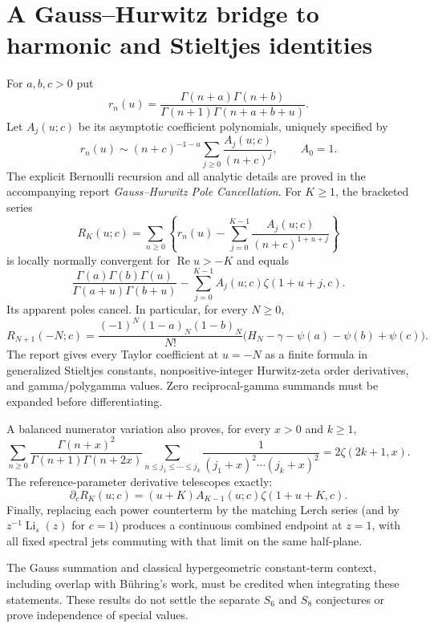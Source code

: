 \section{A Gauss--Hurwitz bridge to harmonic and Stieltjes identities}
\label{gh:sec:summary}
For $a,b,c>0$ put
\[
 r_n(u)=\frac{\Gamma(n+a)\Gamma(n+b)}
 {\Gamma(n+1)\Gamma(n+a+b+u)}.
\]
Let $A_j(u;c)$ be its asymptotic coefficient polynomials, uniquely specified by
\[
 r_n(u)\sim(n+c)^{-1-u}\sum_{j\ge0}\frac{A_j(u;c)}{(n+c)^j},
 \qquad A_0=1.
\]
The explicit Bernoulli recursion and all analytic details are proved in the
accompanying report \emph{Gauss--Hurwitz Pole Cancellation}.
For $K\ge1$, the bracketed series
\[
 R_K(u;c)=\sum_{n\ge0}\left\{r_n(u)-
              \sum_{j=0}^{K-1}\frac{A_j(u;c)}{(n+c)^{1+u+j}}\right\}
\]
is locally normally convergent for $\operatorname{Re}u>-K$ and equals
\[
 \frac{\Gamma(a)\Gamma(b)\Gamma(u)}{\Gamma(a+u)\Gamma(b+u)}
 -\sum_{j=0}^{K-1}A_j(u;c)\zeta(1+u+j,c).
\]
Its apparent poles cancel.  In particular, for every $N\ge0$,
\[
 R_{N+1}(-N;c)=\frac{(-1)^N(1-a)_N(1-b)_N}{N!}
 \bigl(H_N-\gamma-\psi(a)-\psi(b)+\psi(c)\bigr).
\]
The report gives every Taylor coefficient at $u=-N$ as a finite formula
in generalized Stieltjes constants, nonpositive-integer Hurwitz-zeta
order derivatives, and gamma/polygamma values.  Zero reciprocal-gamma
summands must be expanded before differentiating.

A balanced numerator variation also proves, for every $x>0$ and $k\ge1$,
\[
 \sum_{n\ge0}\frac{\Gamma(n+x)^2}{\Gamma(n+1)\Gamma(n+2x)}
 \sum_{n\le j_1\le\cdots\le j_k}
 \frac1{(j_1+x)^2\cdots(j_k+x)^2}=2\zeta(2k+1,x).
\]
The reference-parameter derivative telescopes exactly:
\[
 \partial_cR_K(u;c)=(u+K)A_{K-1}(u;c)\zeta(1+u+K,c).
\]
Finally, replacing each power counterterm by the matching Lerch series
(and by $z^{-1}\operatorname{Li}_s(z)$ for $c=1$) produces a continuous
combined endpoint at $z=1$, with all fixed spectral jets commuting with
that limit on the same half-plane.

The Gauss summation and classical hypergeometric constant-term context,
including overlap with B\"uhring's work, must be credited when integrating
these statements.  These results do not settle the separate $S_6$ and
$S_8$ conjectures or prove independence of special values.

